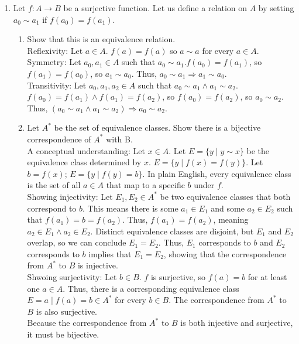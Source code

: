 \documentclass{article}
\begin{document}
\begin{enumerate}
      \item Let $f:A \to B$ be a surjective function. Let us define a relation on $A$ by setting $a_{0} \sim a_{1}$ if $f(a_{0}) = f(a_{1})$.
            \begin{enumerate}
                  \item Show that this is an equivalence relation.\\
                        Reflexivity: Let $a \in A$. $f(a) = f(a)$ so $a \sim a$ for every $a \in A$.\\
                        Symmetry: Let $a_{0}, a_{1} \in A$ such that $a_{0} \sim a_{1}$.$f(a_{0}) = f(a_{1})$, so $f(a_{1}) = f(a_{0})$, so $a_{1} \sim a_{0}$. Thus, $a_{0} \sim a_{1} \Rightarrow a_{1} \sim a_{0}$.\\
                        Transitivity: Let $a_{0}, a_{1}, a_{2} \in A$ such that $a_{0} \sim a_{1} \land a_{1} \sim a_{2}$. $f(a_{0}) = f(a_{1}) \land f(a_{1}) = f(a_{2})$, so $f(a_{0}) = f(a_{2})$, so $a_{0} \sim a_{2}$. Thus, $(a_{0} \sim a_{1} \land a_{1} \sim a_{2}) \Rightarrow a_{0} \sim a_{2}$.
                  \item Let $A^{*}$ be the set of equivalence classes. Show there is a bijective correspondence of $A^{*}$ with B.\\
                        A conceptual understanding: Let $x \in A$. Let $E = \{y \mid y \sim x\}$ be the equivalence class determined by $x$. $E = \{y \mid f(x) = f(y)\}$. Let $b = f(x)$; $E = \{y \mid f(y) = b\}$. In plain English, every equivalence class is the set of all $a \in A$ that map to a specific $b$ under $f$.\\
                        Showing injectivity: Let $E_{1}, E_{2} \in A^{*}$ be two equivalence classes that both correspond to $b$. This means there is some $a_{1} \in E_{1}$ and some $a_{2} \in E_{2}$ such that $f(a_{1}) = b = f(a_{2})$. Thus, $f(a_{1}) = f(a_{2})$, meaning $a_{2} \in E_{1} \land a_{2} \in E_{2}$. Distinct equivalence classes are disjoint, but $E_{1}$ and $E_{2}$ overlap, so we can conclude $E_{1} = E_{2}$. Thus, $E_{1}$ corresponds to $b$ and $E_{2}$ corresponds to $b$ implies that $E_{1} = E_{2}$, showing that the correspondence from $A^{*}$ to $B$ is injective.\\
                        Shwoing surjectivity: Let $b \in B$. $f$ is surjective, so $f(a) = b$ for at least one $a \in A$. Thus, there is a corresponding equivalence class $E = {a \mid f(a) = b} \in A^{*}$ for every $b \in B$. The correspondence from $A^{*}$ to $B$ is also surjective.\\
                        Because the correspondence from $A^{*}$ to $B$ is both injective and surjective, it must be bijective.
            \end{enumerate}
\end{enumerate}
\end{document}

